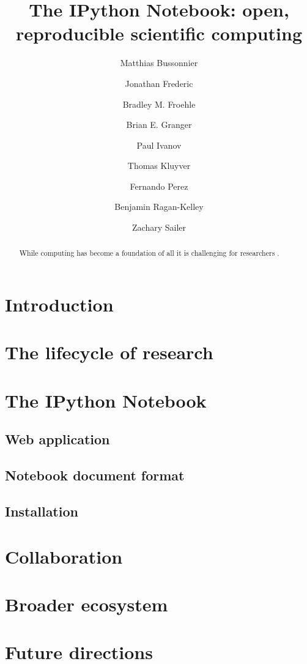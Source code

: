 \documentclass[12pt]{article}
\title{The IPython Notebook: open, reproducible scientific computing}
\author[1]{Matthias Bussonnier}
\author[2]{Jonathan Frederic}
\author[3]{Bradley M. Froehle}
\author[2]{Brian E. Granger}
\author[3]{Paul Ivanov}
\author[3]{Thomas Kluyver}
\author[3]{Fernando Perez}
\author[3]{Benjamin Ragan-Kelley}
\author[2]{Zachary Sailer}
\affil[1]{Affiliation of Matthias}
\affil[2]{Cal Poly State University}
\affil[3]{University of CA, Berkeley}
\begin{document}
\maketitle

\begin{abstract}
While computing has become a foundation of all it is challenging for researchers . 
\end{abstract}

\section{Introduction}

\section{The lifecycle of research}

\section{The IPython Notebook}

\subsection{Web application}

\subsection{Notebook document format}

\subsection{Installation}

\section{Collaboration}

\section{Broader ecosystem}

\section{Future directions}
\end{document}
